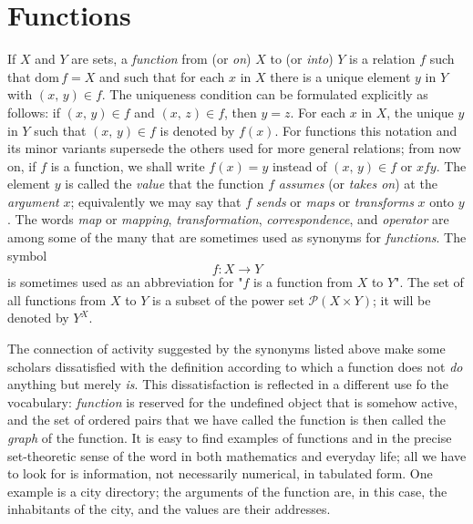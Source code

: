 \section{Functions}

If $X$ and $Y$ are sets, a \textit{function} from (or \textit{on}) $X$ to (or \textit{into}) $Y$ is a relation $f$ such that $\text{dom} \, f = X$ and such that for each $x$ in $X$ there is a unique element $y$ in $Y$ with $(x, \, y) \in f$. The uniqueness condition can be formulated explicitly as follows: if $(x, \, y) \in f$ and $(x, \, z) \in f$, then $y = z$. For each $x$ in $X$, the unique $y$ in $Y$ such that $(x, \, y) \in f$ is denoted by $f(x)$. For functions this notation and its minor variants supersede the others used for more general relations; from now on, if $f$ is a function, we shall write $f(x) = y$ instead of $(x, \, y) \in f$ or $x f y$. The element $y$ is called the \textit{value} that the function $f$ \textit{assumes} (or \textit{takes on}) at the \textit{argument} $x$; equivalently we may say that $f$ \textit{sends} or \textit{maps} or \textit{transforms} $x$ onto $y$. The words \textit{map} or \textit{mapping}, \textit{transformation}, \textit{correspondence}, and \textit{operator} are among some of the many that are sometimes used as synonyms for \textit{functions}. The symbol
\[
	f : X \to Y
\]
is sometimes used as an abbreviation for "$f$ is a function from $X$ to $Y$". The set of all functions from $X$ to $Y$ is a subset of the power set $\mathcal{P}(X \times Y)$; it will be denoted by $Y^X$.

The connection of activity suggested by the synonyms listed above make some scholars dissatisfied with the definition according to which a function does not \textit{do} anything but merely \textit{is}. This dissatisfaction is reflected in a different use fo the vocabulary: \textit{function} is reserved for the undefined object that is somehow active, and the set of ordered pairs that we have called the function is then called the \textit{graph} of the function. It is easy to find examples of functions and in the precise set-theoretic sense of the word in both mathematics and everyday life; all we have to look for is information, not necessarily numerical, in tabulated form. One example is a city directory; the arguments of the function are, in this case, the inhabitants of the city, and the values are their addresses.

